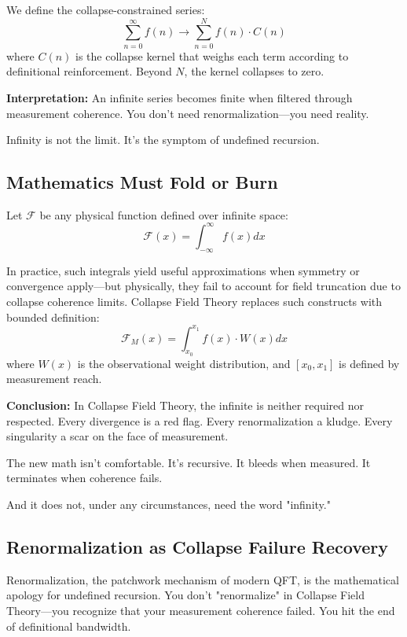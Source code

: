 We define the collapse-constrained series:
\begin{equation}
\sum_{n=0}^{\infty} f(n) \to \sum_{n=0}^{N} f(n) \cdot C(n)
\end{equation}
where $C(n)$ is the collapse kernel that weighs each term according to definitional reinforcement. Beyond $N$, the kernel collapses to zero.

\textbf{Interpretation:} An infinite series becomes finite when filtered through measurement coherence. You don’t need renormalization—you need reality.

Infinity is not the limit. It’s the symptom of undefined recursion.

\subsection*{Mathematics Must Fold or Burn}

Let $\mathcal{F}$ be any physical function defined over infinite space:
\begin{equation}
\mathcal{F}(x) = \int_{-\infty}^{\infty} f(x) dx
\end{equation}

In practice, such integrals yield useful approximations when symmetry or convergence apply—but physically, they fail to account for field truncation due to collapse coherence limits. Collapse Field Theory replaces such constructs with bounded definition:
\begin{equation}
\mathcal{F}_M(x) = \int_{x_0}^{x_1} f(x) \cdot W(x) dx
\end{equation}
where $W(x)$ is the observational weight distribution, and $[x_0,x_1]$ is defined by measurement reach.

\textbf{Conclusion:} In Collapse Field Theory, the infinite is neither required nor respected. Every divergence is a red flag. Every renormalization a kludge. Every singularity a scar on the face of measurement.

The new math isn’t comfortable. It’s recursive. It bleeds when measured. It terminates when coherence fails.

And it does not, under any circumstances, need the word "infinity."

\subsection*{Renormalization as Collapse Failure Recovery}

Renormalization, the patchwork mechanism of modern QFT, is the mathematical apology for undefined recursion. You don't "renormalize" in Collapse Field Theory—you recognize that your measurement coherence failed. You hit the end of definitional bandwidth.

